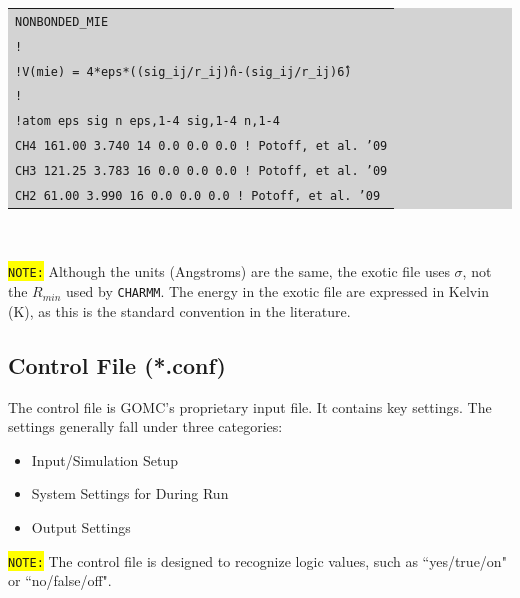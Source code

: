 \colorbox{lightgray}{
\begin{tabular}{l}
\texttt{NONBONDED\_MIE}\\
\texttt{!}\\
\texttt{!V(mie) = 4*eps*((sig\_ij/r\_ij)\^n-(sig\_ij/r\_ij)\^6)}\\
\texttt{!}\\
\texttt{!atom   eps          sig        n    eps,1-4    sig,1-4     n,1-4 }\\
\texttt{CH4     161.00       3.740      14   0.0 0.0 0.0 ! Potoff, et al. '09}\\
\texttt{CH3     121.25       3.783      16   0.0 0.0 0.0 ! Potoff, et al. '09}\\
\texttt{CH2       61.00       3.990      16   0.0 0.0 0.0 ! Potoff, et al. '09}\\
\end{tabular}}\\\\
\colorbox{yellow}{\texttt{NOTE:}} Although the units (Angstroms) are the same, the exotic file uses $\sigma$, not the $R_{min}$ used by \texttt{CHARMM}. The energy in the exotic file are expressed in Kelvin (K), as this is the standard convention in the literature.\\
\subsection{Control File (*.conf)}
The control file is GOMC's proprietary input file. It contains key settings. The settings generally fall under three categories:
\begin{itemize}
\item Input/Simulation Setup
\item System Settings for During Run
\item Output Settings
\end{itemize}
\colorbox{yellow}{\texttt{NOTE:}} The control file is designed to recognize logic values, such as ``yes/true/on" or ``no/false/off".\\

